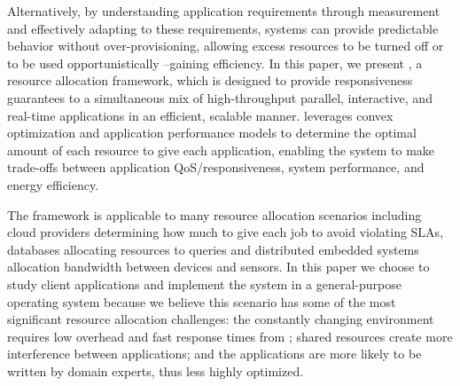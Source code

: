 Alternatively, by understanding application requirements through measurement and effectively adapting to these requirements, systems can provide predictable behavior without over-provisioning, allowing excess resources to be turned off or to be used opportunistically --gaining efficiency.  In this paper, we present \pacora, a resource allocation framework, which is designed to provide responsiveness guarantees to a simultaneous mix of high-throughput parallel, interactive, and real-time applications in an efficient, scalable manner. \pacora leverages convex optimization and application performance models to determine the optimal amount of each resource to give each application, enabling the system to make trade-offs between application QoS/responsiveness, system performance, and energy efficiency. 

The \pacora framework is applicable to many resource allocation scenarios including cloud providers determining how much to give each job to avoid violating SLAs, databases allocating resources to queries and distributed embedded systems allocation bandwidth between devices and sensors.  In this paper we choose to study client applications and implement the system in a general-purpose operating system because we believe this scenario has some of the most significant resource allocation challenges: the constantly changing environment requires low overhead and fast response times from \pacora;  shared resources create more interference between applications; and the applications are more likely to be written by domain experts, thus less highly optimized.



